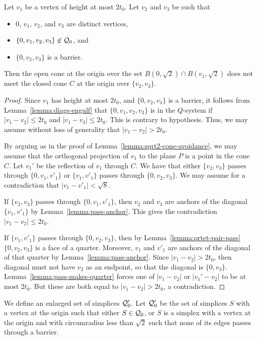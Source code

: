 \begin{lemma}\label{lemma:cone-avoidance}
     Let $v_1$ be a vertex of height at most $2t_0$.  Let $v_2$
     and
     $v_3$ be such that
     \begin{itemize}
        \item $0$, $v_1$, $v_2$, and $v_3$ are distinct vertices,
        \item $\{0,v_1,v_2,v_3\}\not\in {\mathcal Q}_0$, and
        \item $\{0,v_2,v_3\}$ is a barrier.
     \end{itemize}
     Then the open cone at the origin over the set $B(0,\sqrt2)\cap
     B(v_1,\sqrt2)$ does not meet the closed cone $C$ at the origin over $\{v_2,v_3\}$.
\end{lemma}

\begin{proof}
Since $v_1$ has height at most $2t_0$, and $\{0,v_2,v_3\}$ is a
barrier, it follows from Lemma~\ref{lemma:diags-engulf} that
$\{0,v_1,v_2,v_3\}$ is in the $Q$-system if $|v_1-v_2|\le 2t_0$
and $|v_1-v_3|\le 2t_0$.  This is contrary to hypothesis. Thus, we
may assume without loss of generality that $|v_1-v_2|>2t_0$.

By arguing as in the proof of
Lemma~\ref{lemma:sqrt2-cone-avoidance}, we may assume that the
orthogonal projection of $v_1$ to the plane $P$ is a point in the
cone $C$. Let $v_1'$ be the reflection of $v_1$ through $C$.  We
have that either $\{v_2,v_3\}$ passes through $\{0,v_1,v'_1\}$ or
$\{v_1,v'_1\}$ passes through $\{0,v_2,v_3\}$.  We may assume for
a contradiction that $|v_1-v'_1|<\sqrt8$.

If $\{v_2,v_3\}$ passes through $\{0,v_1,v'_1\}$, then $v_2$ and
$v_3$ are anchors of the diagonal $\{v_1,v'_1\}$ by
Lemma~\ref{lemma:pass-anchor}.  This gives the contradiction
$|v_1-v_2|\le2t_0$.

If $\{v_1,v'_1\}$ passes through $\{0,v_2,v_3\}$, then by
Lemma~\ref{lemma:qrtet-pair-pass} $\{0,v_2,v_3\}$ is a face of a
quarter. Moreover, $v_1$ and $v'_1$ are anchors of the diagonal of
that quarter by Lemma~\ref{lemma:pass-anchor}.  Since
$|v_1-v_2|>2t_0$, then diagonal must not have $v_2$ as an
endpoint, so that the diagonal is $\{0,v_3\}$.
Lemma~\ref{lemma:pass-makes-quarter} forces one of $|v_1-v_2|$ or
$|v_1'-v_2|$ to be at most $2t_0$. But these are both equal to
$|v_1-v_2|>2t_0$, a contradiction.
\end{proof}


\begin{definition}  We define an enlarged set of simplices
${\mathcal Q}_0'$.  Let ${\mathcal Q}_0'$ be the set of simplices $S$ with a
vertex at the origin such that either $S\in{\mathcal Q}_0$, or $S$ is a
simplex with a vertex at the origin and with circumradius less
than $\sqrt2$ such that none of its edges passes through a
barrier.
\end{definition}


